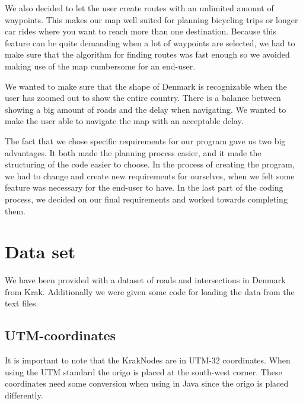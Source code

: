 We also decided to let the user create routes with an unlimited amount of
waypoints. This makes our map well suited for planning bicycling trips or longer
car rides where you want to reach more than one destination. Because this
feature can be quite demanding when a lot of waypoints are selected, we had to
make sure that the algorithm for finding routes was fast enough so we avoided
making use of the map cumbersome for an end-user.

We wanted to make sure that the shape of Denmark is recognizable when
the user has zoomed out to show the entire country. There is a balance between
showing a big amount of roads and the delay when navigating. We wanted to make
the user able to navigate the map with an acceptable delay. 

The fact that we chose specific requirements for our program gave us two big
advantages. It both made the planning process easier, and it made the
structuring of the code easier to choose. In the process of creating the
program, we had to change and create new requirements for ourselves, when we
felt some feature was necessary for the end-user to have. In the last part of
the coding process, we decided on our final requirements and worked towards completing them. 

\section{Data set}
\label{BG-DS}
We have been provided with a dataset of roads and intersections in Denmark 
from Krak. Additionally we were given some code for loading the data from the 
text files.

\subsection{UTM-coordinates}
\label{BG-DS-UTM}
It is important to note that the KrakNodes are in UTM-32 coordinates. When 
using the UTM standard the origo is placed at the south-west corner. These 
coordinates need some conversion when using in Java since the origo is placed 
differently.

